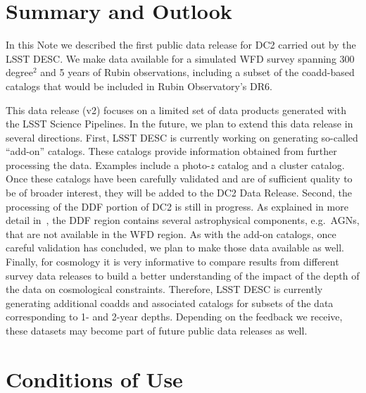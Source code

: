 \documentclass[modern]{descnote}
\newcommand*{\thisversion}{v2}
\begin{document}
\section{Summary and Outlook}
\label{sec:outlook}
In this Note we described the first public data release for DC2 carried out by the LSST DESC. We make data available for a simulated WFD survey spanning 300 degree$^2$ and 5 years of Rubin observations, including a subset of the coadd-based catalogs that would be included in Rubin Observatory's DR6. %

This data release (\thisversion{}) focuses on a limited set of data products generated with the LSST Science Pipelines. In the future, we plan to extend this data release in several directions. First, LSST DESC is currently working on generating so-called ``add-on'' catalogs. These catalogs provide information obtained from further processing the data. Examples include a photo-$z$ catalog and a cluster catalog. Once these catalogs have been carefully validated and are of sufficient quality to be of broader interest, they will be added to the DC2 Data Release. Second, the processing of the DDF portion of DC2 is still in progress. As explained in more detail in~\cite{2020arXiv201005926L}, the DDF region contains several astrophysical components, e.g.~AGNs, that are not available in the WFD region. As with the add-on catalogs, once careful validation has concluded, we plan to make those data available as well. Finally, for cosmology it is very informative to compare results from different survey data releases to build a better understanding of the impact of the depth of the data on cosmological constraints. Therefore, LSST DESC is currently generating additional coadds and associated catalogs for subsets of the data corresponding to 1- and 2-year depths. Depending on the feedback we receive, these datasets may become part of future public data releases as well.

\section{Conditions of Use}
\end{document}
